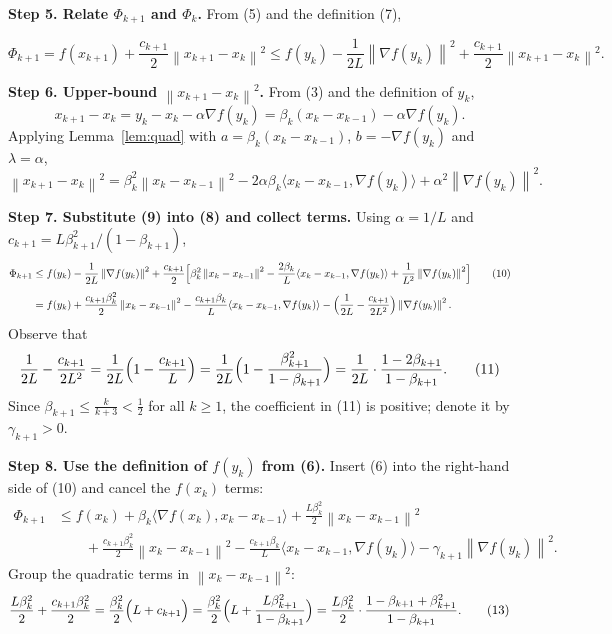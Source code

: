 \documentclass{article}
\newcommand{\norm}[1]{\left\lVert#1\right\rVert}
\newcommand{\grad}{\nabla}
\begin{document}
\noindent\textbf{Step 5.  Relate $\Phi_{k+1}$ and $\Phi_k$.}  
From (5) and the definition (7),

\[
\Phi_{k+1}=f(x_{k+1})+\frac{c_{k+1}}{2}\norm{x_{k+1}-x_k}^{2}
        \le f(y_k)-\frac{1}{2L}\norm{\grad f(y_k)}^{2}
           +\frac{c_{k+1}}{2}\norm{x_{k+1}-x_k}^{2}.
\tag{8}
\]

\noindent\textbf{Step 6.  Upper‑bound $\norm{x_{k+1}-x_k}^{2}$.}  
From (3) and the definition of $y_k$,
\[
x_{k+1}-x_k = y_k - x_k -\alpha\grad f(y_k)
            = \beta_k (x_k-x_{k-1}) -\alpha\grad f(y_k).
\]
Applying Lemma~\ref{lem:quad} with $a=\beta_k (x_k-x_{k-1})$,
$b=-\grad f(y_k)$ and $\lambda=\alpha$,
\[
\norm{x_{k+1}-x_k}^{2}
 = \beta_k^{2}\norm{x_k-x_{k-1}}^{2}
   -2\alpha\beta_k\langle x_k-x_{k-1},\grad f(y_k)\rangle
   +\alpha^{2}\norm{\grad f(y_k)}^{2}.
\tag{9}
\]

\noindent\textbf{Step 7.  Substitute (9) into (8) and collect terms.}  
Using $\alpha=1/L$ and $c_{k+1}=L\beta_{k+1}^{2}/(1-\beta_{k+1})$,
\begin{align*}
\Phi_{k+1}
&\le f(y_k)-\frac{1}{2L}\norm{\grad f(y_k)}^{2}
   +\frac{c_{k+1}}{2}\Bigl[
        \beta_k^{2}\norm{x_k-x_{k-1}}^{2}
        -\frac{2\beta_k}{L}\langle x_k-x_{k-1},\grad f(y_k)\rangle
        +\frac{1}{L^{2}}\norm{\grad f(y_k)}^{2}
        \Bigr]                                              \tag{10}\\[4pt]
&= f(y_k)
   +\frac{c_{k+1}\beta_k^{2}}{2}\norm{x_k-x_{k-1}}^{2}
   -\frac{c_{k+1}\beta_k}{L}\langle x_k-x_{k-1},\grad f(y_k)\rangle
   -\Bigl(\frac{1}{2L}-\frac{c_{k+1}}{2L^{2}}\Bigr)\norm{\grad f(y_k)}^{2}.
\end{align*}
Observe that
\[
\frac{1}{2L}-\frac{c_{k+1}}{2L^{2}}
   =\frac{1}{2L}\Bigl(1-\frac{c_{k+1}}{L}\Bigr)
   =\frac{1}{2L}\Bigl(1-\frac{\beta_{k+1}^{2}}{1-\beta_{k+1}}\Bigr)
   =\frac{1}{2L}\cdot\frac{1-2\beta_{k+1}}{1-\beta_{k+1}}.
\tag{11}
\]
Since $\beta_{k+1}\le\frac{k}{k+3}<\frac12$ for all $k\ge1$, the coefficient in
(11) is positive; denote it by $\gamma_{k+1}>0$.

\noindent\textbf{Step 8.  Use the definition of $f(y_k)$ from (6).}  
Insert (6) into the right‑hand side of (10) and cancel the $f(x_k)$ terms:
\begin{align*}
\Phi_{k+1}
&\le f(x_k)+\beta_k\langle\grad f(x_k),x_k-x_{k-1}\rangle
       +\frac{L\beta_k^{2}}{2}\norm{x_k-x_{k-1}}^{2}             \\
&\qquad
   +\frac{c_{k+1}\beta_k^{2}}{2}\norm{x_k-x_{k-1}}^{2}
   -\frac{c_{k+1}\beta_k}{L}\langle x_k-x_{k-1},\grad f(y_k)\rangle
   -\gamma_{k+1}\norm{\grad f(y_k)}^{2}.
\tag{12}
\end{align*}
Group the quadratic terms in $\norm{x_k-x_{k-1}}^{2}$:
\[
\frac{L\beta_k^{2}}{2}
   +\frac{c_{k+1}\beta_k^{2}}{2}
 =\frac{\beta_k^{2}}{2}\Bigl(L+c_{k+1}\Bigr)
 =\frac{\beta_k^{2}}{2}\Bigl(L+\frac{L\beta_{k+1}^{2}}{1-\beta_{k+1}}\Bigr)
 =\frac{L\beta_k^{2}}{2}\cdot\frac{1-\beta_{k+1}+\beta_{k+1}^{2}}{1-\beta_{k+1}} .
\tag{13}
\]
\end{document}
